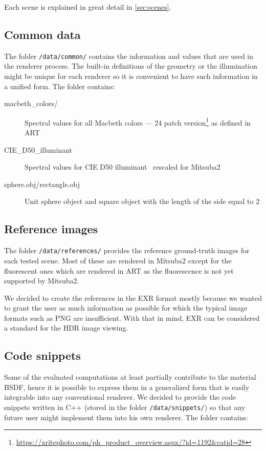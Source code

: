 Each scene is explained in great detail in \autoref{sec:scenes}.

\subsection{Common data}

The folder \texttt{/data/common/} contains the information and values that are used in the renderer process. The built-in definitions of the geometry or the illumination might be unique for each renderer so it is convenient to have such information in a unified form. The folder contains:

\begin{description}
	\item[macbeth\_colors/] Spectral values for all Macbeth colors --- 24 patch version\footnote{\url{https://xritephoto.com/ph_product_overview.aspx/?id=1192&catid=28}} as defined in ART
	\item[CIE\_D50\_illuminant] Spectral values for CIE D50 illuminant~\cite{cieData} rescaled for Mitsuba2
	\item[sphere.obj/rectangle.obj] Unit sphere object and square object with the length of the side equal to 2
\end{description}

\subsection{Reference images}

The folder \texttt{/data/references/} provides the reference ground-truth images for each tested scene. Most of these are rendered in Mitsuba2 except for the fluorescent ones which are rendered in ART as the fluorescence is not yet supported by Mitsuba2.

We decided to create the references in the EXR format mostly because we wanted to grant the user as much information as possible for which the typical image formats such as PNG are insufficient. With that in mind, EXR can be considered a standard for the HDR image viewing.

\subsection{Code snippets}

Some of the evaluated computations at least partially contribute to the material BSDF, hence it is possible to express them in a generalized form that is easily integrable into any conventional renderer. We decided to provide the code snippets written in C++ (stored in the folder \texttt{/data/snippets/}) so that any future user might implement them into his own renderer. The folder contains:

